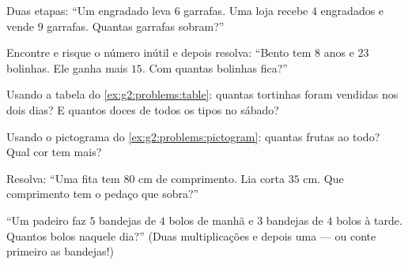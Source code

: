 \begin{exercise}[$\star$]\label{exo:g2:problems:5}
Duas etapas: ``Um engradado leva $6$ garrafas. Uma loja recebe $4$
engradados e vende $9$ garrafas. Quantas garrafas sobram?''
\end{exercise}

\begin{exercise}[$\star$]\label{exo:g2:problems:6}
Encontre e risque o número inútil e depois resolva: ``Bento tem $8$
anos e $23$ bolinhas. Ele ganha mais $15$. Com quantas bolinhas
fica?''
\end{exercise}

\begin{exercise}[$\star$]\label{exo:g2:problems:7}
Usando a tabela do \cref{ex:g2:problems:table}: quantas tortinhas
foram vendidas nos dois dias? E quantos doces de todos os tipos no
sábado?
\end{exercise}

\begin{exercise}[$\star$]\label{exo:g2:problems:8}
Usando o pictograma do \cref{ex:g2:problems:pictogram}: quantas
frutas ao todo? Qual cor tem mais?
\end{exercise}

\begin{exercise}[$\star$]\label{exo:g2:problems:9}
Resolva: ``Uma fita tem $80$ cm de comprimento. Lia corta $35$ cm.
Que comprimento tem o pedaço que sobra?''
\end{exercise}

\begin{exercise}[$\star\star$]\label{exo:g2:problems:10}
``Um padeiro faz $5$ bandejas de $4$ bolos de manhã e $3$ bandejas de
$4$ bolos à tarde. Quantos bolos naquele dia?'' (Duas
multiplicações e depois uma  --- ou conte primeiro as
bandejas!)
\end{exercise}
